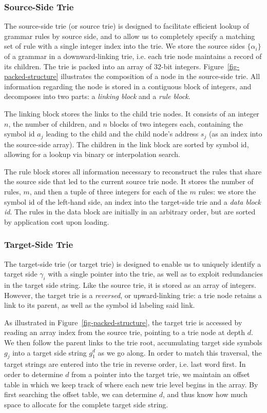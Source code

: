 \documentclass[11pt]{article}
\begin{document}
\subsubsection{Source-Side Trie}

The source-side trie (or source trie) is designed to facilitate
efficient lookup of grammar rules by source side, and to allow us to
completely specify a matching set of rule with a single integer index
into the trie. We store the source sides $\{\alpha_i\}$ of a grammar
in a downward-linking trie, i.e. each trie node maintains a record of
its children. The trie is packed into an array of 32-bit
integers. Figure~\ref{fig-packed-structure} illustrates the
composition of a node in the source-side trie. All information
regarding the node is stored in a contiguous block of integers, and
decomposes into two parts: a \emph{linking block} and a \emph{rule
  block}.

The linking block stores the links to the child trie nodes. It
consists of an integer $n$, the number of children, and $n$ blocks of
two integers each, containing the symbol id $a_j$ leading to the child
and the child node's address $s_j$ (as an index into the source-side
array). The children in the link block are sorted by symbol id,
allowing for a lookup via binary or interpolation search.

The rule block stores all information necessary to reconstruct the
rules that share the source side that led to the current source trie
node. It stores the number of rules, $m$, and then a tuple of three
integers for each of the $m$ rules: we store the symbol id of the
left-hand side, an index into the target-side trie and a \emph{data
  block id}. The rules in the data block are initially in an arbitrary
order, but are sorted by application cost upon loading.

\subsubsection{Target-Side Trie}

The target-side trie (or target trie) is designed to enable us to
uniquely identify a target side $\gamma_i$ with a single pointer into
the trie, as well as to exploit redundancies in the target side
string. Like the source trie, it is stored as an array of
integers. However, the target trie is a \emph{reversed}, or
upward-linking trie: a trie node retains a link to its parent, as well
as the symbol id labeling said link.

As illustrated in Figure~\ref{fig-packed-structure}, the target trie
is accessed by reading an array index from the source trie, pointing
to a trie node at depth $d$. We then follow the parent links to the
trie root, accumulating target side symbols $g_j$ into a target side
string $g_1^d$ as we go along. In order to match this traversal, the
target strings are entered into the trie in reverse order, i.e. last
word first. In order to determine $d$ from a pointer into the target
trie, we maintain an offset table in which we keep track of where each
new trie level begins in the array. By first searching the offset
table, we can determine $d$, and thus know how much space to allocate
for the complete target side string.
\end{document}
